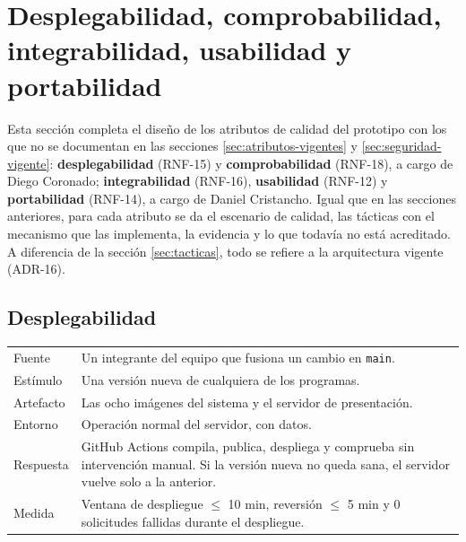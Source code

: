 
\section{Desplegabilidad, comprobabilidad, integrabilidad, usabilidad y portabilidad}
\label{sec:atributos-equipo}

Esta sección completa el diseño de los atributos de calidad del prototipo con los que no se
documentan en las secciones \ref{sec:atributos-vigentes} y \ref{sec:seguridad-vigente}:
\textbf{desplegabilidad} (RNF-15) y \textbf{comprobabilidad} (RNF-18), a cargo de Diego Coronado;
\textbf{integrabilidad} (RNF-16), \textbf{usabilidad} (RNF-12) y \textbf{portabilidad} (RNF-14), a
cargo de Daniel Cristancho. Igual que en las secciones anteriores, para cada atributo se da el
escenario de calidad, las tácticas con el mecanismo que las implementa, la evidencia y lo que
todavía no está acreditado. A diferencia de la sección \ref{sec:tacticas}, todo se refiere a la
arquitectura vigente (ADR-16).

\subsection{Desplegabilidad}
\label{sec:desplegabilidad-vigente}

\begin{center}
\begin{tabular}{|>{\raggedright\arraybackslash}p{3.2cm}|>{\raggedright\arraybackslash}p{10.4cm}|}
\hline
\multicolumn{2}{|l|}{\textbf{Escenario de calidad · Desplegabilidad (RNF-15)}}\\
\hline
Fuente & Un integrante del equipo que fusiona un cambio en \texttt{main}.\\
\hline
Estímulo & Una versión nueva de cualquiera de los programas.\\
\hline
Artefacto & Las ocho imágenes del sistema y el servidor de presentación.\\
\hline
Entorno & Operación normal del servidor, con datos.\\
\hline
Respuesta & GitHub Actions compila, publica, despliega y comprueba sin intervención manual. Si la
versión nueva no queda sana, el servidor vuelve solo a la anterior.\\
\hline
Medida & Ventana de despliegue $\leq$ 10 min, reversión $\leq$ 5 min y 0 solicitudes fallidas
durante el despliegue.\\
\hline
\end{tabular}
\end{center}


